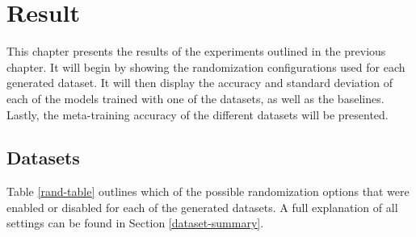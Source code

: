 \chapter{Result}
This chapter presents the results of the experiments outlined in the previous chapter. It will begin by showing the randomization configurations used for each generated dataset. It will then display the accuracy and standard deviation of each of the models trained with one of the datasets, as well as the baselines. Lastly, the meta-training accuracy of the different datasets will be presented.

\section{Datasets}
Table \ref{rand-table} outlines which of the possible randomization options that were enabled or disabled for each of the generated datasets. A full explanation of all settings can be found in Section \ref{dataset-summary}.


\begin{table}[h]
\caption{Randomization configurations for synthetic datasets}
\label{rand-table}
\end{table}


